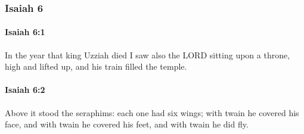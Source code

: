 	\subsubsection{Isaiah 6} %
		\label{ISAIAH-6}

		\paragraph{Isaiah 6:1} %
			\label{ISAIAH-6-1}

			In the year that king Uzziah died I saw also the LORD sitting upon a throne, high and lifted up, and his train filled the temple.


		\paragraph{Isaiah 6:2} %
			\label{ISAIAH-6-2}

			Above it stood the seraphims: each one had six wings; with twain he covered his face, and with twain he covered his feet, and with twain he did fly.

